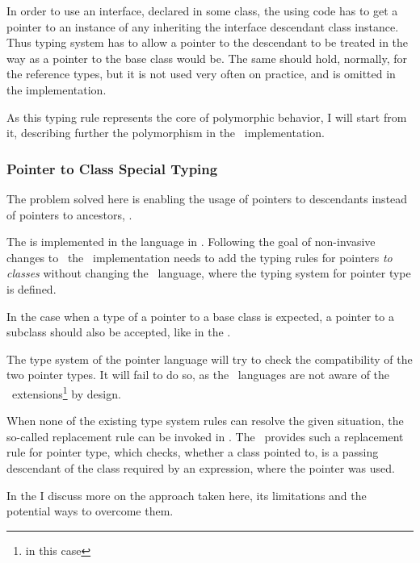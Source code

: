 In order to use an interface, declared in some class, the using code has to get a pointer to an instance
of any inheriting the interface descendant class instance. Thus typing system has to allow a pointer
to the descendant to be treated in the way as a pointer to the base class would be. The same should hold, 
normally, for the reference types, but it is not used very often on practice, and is omitted in the implementation.

As this typing rule represents the core of polymorphic behavior, I will start from it, describing further the
polymorphism in the \pcpp\ implementation.

\subsubsection{Pointer to Class Special Typing}
\label{pointertoclasstyping}

The problem solved here is enabling the usage of pointers to descendants instead of pointers to ancestors,
.


The   is implemented in the  language in \mbdr. 
Following the goal of non-invasive changes to \mbeddr\ the \pcpp\ implementation needs to add the 
typing rules for pointers \emph{to classes} without changing the    \mbdr\ language, where the 
typing system for pointer type is defined.

In the case when a type of a pointer to a base class is expected, a pointer to a subclass should also be accepted, like
in the .

The type system of the pointer language will try to check the compatibility of the two pointer types. It will
fail to do so, as the \mbdr\ languages are not aware of the \pcpp\ extensions\footnote{  in this case} 
by design.

When none of the existing type system rules can resolve the given situation, the so-called replacement
rule can be invoked in \jbmps. The \pcpp\ provides such a replacement rule for pointer type, which checks, whether a
class pointed to, is a passing descendant of the class required by an expression, where the pointer was
used.

In the  I discuss more on the approach taken here, its limitations and 
the potential ways to overcome them.

